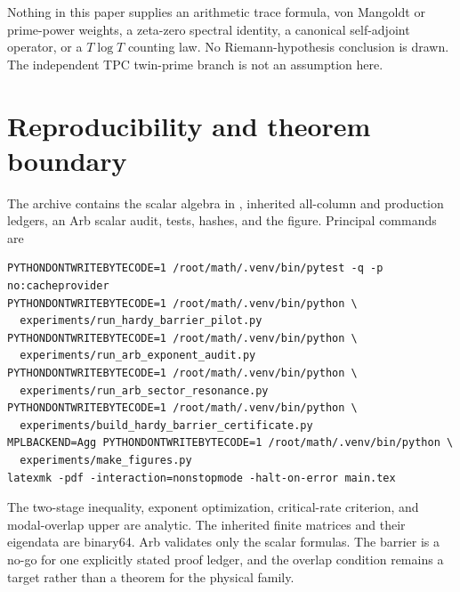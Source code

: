\documentclass[11pt]{article}
\theoremstyle{remark}
\begin{document}
Nothing in this paper supplies an arithmetic trace formula, von Mangoldt or
prime-power weights, a zeta-zero spectral identity, a canonical self-adjoint
operator, or a $T\log T$ counting law.  No Riemann-hypothesis conclusion is
drawn.  The independent TPC twin-prime branch is not an assumption here.

\section{Reproducibility and theorem boundary}

The archive contains the scalar algebra in , inherited
all-column and production ledgers, an Arb scalar audit, tests, hashes, and the
figure.  Principal commands are
\begin{verbatim}
PYTHONDONTWRITEBYTECODE=1 /root/math/.venv/bin/pytest -q -p no:cacheprovider
PYTHONDONTWRITEBYTECODE=1 /root/math/.venv/bin/python \
  experiments/run_hardy_barrier_pilot.py
PYTHONDONTWRITEBYTECODE=1 /root/math/.venv/bin/python \
  experiments/run_arb_exponent_audit.py
PYTHONDONTWRITEBYTECODE=1 /root/math/.venv/bin/python \
  experiments/run_arb_sector_resonance.py
PYTHONDONTWRITEBYTECODE=1 /root/math/.venv/bin/python \
  experiments/build_hardy_barrier_certificate.py
MPLBACKEND=Agg PYTHONDONTWRITEBYTECODE=1 /root/math/.venv/bin/python \
  experiments/make_figures.py
latexmk -pdf -interaction=nonstopmode -halt-on-error main.tex
\end{verbatim}

The two-stage inequality, exponent optimization, critical-rate criterion,
and modal-overlap upper are analytic.  The inherited finite matrices and
their eigendata are binary64.  Arb validates only the scalar formulas.  The
barrier is a no-go for one explicitly stated proof ledger, and the overlap
condition remains a target rather than a theorem for the physical family.



\end{document}
